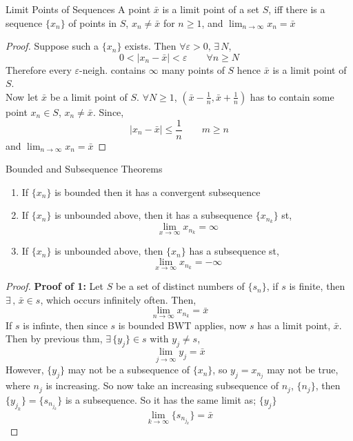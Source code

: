 \documentclass{article}
\newcommand{\e}{\varepsilon}
\newcommand{\ex}{\exists\,}
\newcommand{\xb}{\bar{x}}
\begin{document}
\noindent\begin{theorem}{Limit Points of Sequences}{}
  A point $\xb$ is a limit point of a set $S$, iff there is a sequence $\{ x_n \}$ of points in $S$, $x_n \neq \xb$ for $n \ge 1$, and $\displaystyle{\lim_{n\to\infty}{x_n} = \xb}$
\end{theorem}\vspace{10pt}
\begin{proof}
  Suppose such a $\{x_n\}$ exists. Then $\forall\e>0,\, \ex N$,
  $$ 0 < |x_n - \xb| < \e \qquad \forall n \ge N $$
  Therefore every $\e$-neigh. contains $\infty$ many points of $S$ hence $\xb$ is a limit point of $S$.\\

  Now let $\xb$ be a limit point of $S$. $\forall N \ge 1$, $(\xb - \frac{1}{n}, \xb + \frac{1}{n})$ has to contain some point $x_n \in S$, $x_n \neq \xb$. Since,
  $$ |x_n - \xb| \le \frac{1}{n}\qquad m \ge n $$
  and $\displaystyle{\lim_{n\to\infty}{x_n} = \xb}$
\end{proof}

\noindent\begin{theorem}{Bounded and Subsequence Theorems}{}
  \begin{enumerate}
    \item If $\{ x_n \}$ is bounded then it has a convergent subsequence
    \item If $\{ x_n \}$ is unbounded above, then it has a subsequence $\{ x_{n_k} \}$ st,
    $$ \lim_{x\to\infty}{x_{n_k}} = \infty $$
    \item If $\{ x_n \}$ is unbounded above, then $\{ x_n \}$ has a subsequence st,
    $$ \lim_{x\to\infty}{x_{n_k}} = -\infty $$
  \end{enumerate}
\end{theorem}\vspace{10pt}
\begin{proof}
  \textbf{Proof of 1:} Let $S$ be a set of distinct numbers of $\{ s_n \}$, if $s$ is finite, then $\ex,\, \xb\in s$, which occurs infinitely often. Then,
  $$ \lim_{n\to\infty}{x_{n_k}} = \xb $$
  If $s$ is infinte, then since $s$ is bounded BWT applies, now $s$ has a limit point, $\xb$. Then by previous thm, $\ex\{y_j\}\in s$ with $y_j \neq s$,
  $$ \lim_{j\to\infty}{y_j} = \xb $$
  However, $\{ y_j \}$ may not be a subsequence of $\{ x_n \}$, so $y_j = x_{n_j}$ may not be true, where $n_j$ is increasing. So now take an increasing subsequence of $n_j$, $\{ n_j \}$, then $\{ y_{j_k} \} = \{ s_{n_{j_k}} \}$ is a subsequence. So it has the same limit as; $\{ y_j \}$
  $$ \lim_{k\to\infty}{\{ s_{n_{j_k}} \}} = \xb $$
\end{proof}
\end{document}
